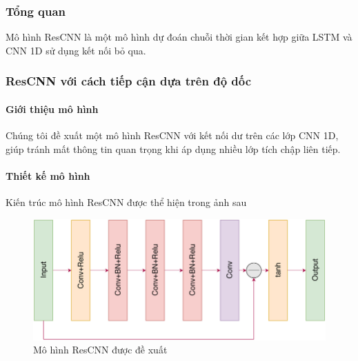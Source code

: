 \documentclass[conference]{IEEEtran}
\begin{document}
\subsubsection{Tổng quan}
Mô hình ResCNN là một mô hình dự đoán chuỗi thời gian kết hợp giữa LSTM và CNN 1D sử dụng kết nối bỏ qua.

\subsubsection{ResCNN với cách tiếp cận dựa trên độ dốc}
\paragraph{Giới thiệu mô hình}
Chúng tôi đề xuất một mô hình ResCNN với kết nối dư trên các lớp CNN 1D, giúp tránh mất thông tin quan trọng khi áp dụng nhiều lớp tích chập liên tiếp.

\paragraph{Thiết kế mô hình} Kiến trúc mô hình ResCNN được thể hiện trong ảnh sau
\begin{figure}[H]
    \centering
    \begin{minipage}{0.43\textwidth}
        \centering
        \includegraphics[width=1\textwidth]{bibliography/figure/ResCNN/ResCNN_1.png}
        \caption{Mô hình ResCNN được đề xuất}
        \label{fig:gru_del_up}
    \end{minipage}
\end{figure}
\end{document}
